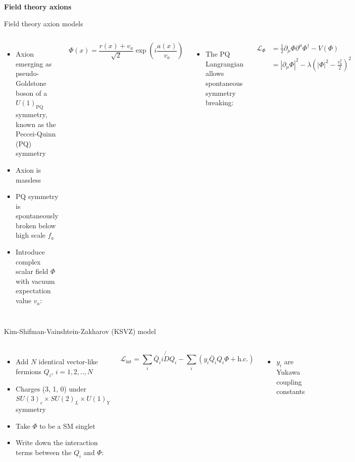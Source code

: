 \documentclass[aspectratio=1610, 9pt]{beamer}
\begin{document}
\begin{frame}[noframenumbering]
  \centering
  \Huge \textbf{\textcolor{tugreen}{Field theory axions}}
\end{frame}

\begin{frame}{Field theory axion models}
  \begin{columns}
    \column{\textwidth}
    \begin{itemize}
      \item Axion emerging as pseudo-Goldstone boson of a $U(1)_{\text{PQ}}$ symmetry, known as the Peccei-Quinn (PQ) symmetry
      \item Axion is massless
      \item PQ symmetry is spontaneously broken below high scale $f_a$
      \item Introduce complex scalar field $\Phi$ with vacuum expectation value $v_a$:
    \end{itemize}
    \begin{equation*}
      \Phi(x) = \frac{r(x)+v_a}{\sqrt{2}}\exp \left(i\frac{a(x)}{v_a}\right) 
    \end{equation*}
    \begin{itemize}
    \item The PQ Langrangian allows spontaneous symmetry breaking:
    \end{itemize}
    \begin{align*}
      \mathcal{L}_{\Phi} &= \frac{1}{2} \partial_\mu \Phi \partial^\mu \Phi^\dagger - V(\Phi) \\
      & =  {| \partial_\mu \Phi |}^2 - \lambda \left( |\Phi|^2 - \frac{v_a^2}{2} \right)^2
    \end{align*}
  \end{columns} 
\end{frame}

\begin{frame}{Kim-Shifman-Vainshtein-Zakharov (KSVZ) model}
  \begin{columns}
    \column{\textwidth}
    \begin{itemize}
      \item Add $N$ identical vector-like fermions $Q_i$, $i=1,2,..,N$
      \item Charges (3, 1, 0) under $SU(3)_c × SU(2)_L × U(1)_Y$ symmetry
      \item Take $\Phi$ to be a SM singlet
      \item Write down the interaction terms between the $Q_i$ and $\Phi$:
    \end{itemize}
    \begin{equation*}
      \mathcal{L}_{\text{int}} = \sum_i \bar{Q}_i i \not{D} Q_i - \sum_i \left( y_i \bar{Q}_i Q_i \Phi + \text{h.c.} \right)
    \end{equation*}
    \begin{itemize}
      \item $y_i$ are Yukawa coupling constants
    \end{itemize}
  \end{columns} 
\end{frame}
\end{document}
